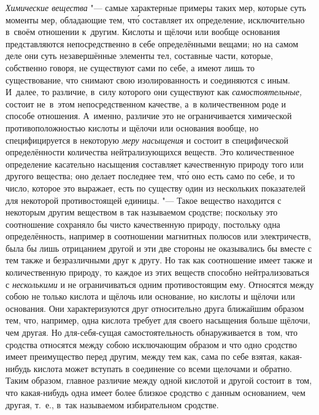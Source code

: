 {\em Химические вещества} "--- самые характерные примеры таких мер, которые
суть моменты мер, обладающие тем, чт\'{о} составляет их определение,
исключительно в~своём отношении к~другим. Кислоты и щёлочи или
вообще основания представляются непосредственно в себе определёнными вещами; но
на самом деле они суть незавершённые элементы тел, составные части, которые,
собственно говоря, не существуют сами по себе, а имеют лишь то существование,
что снимают свою изолированность и соединяются с иным. И~далее, то различие,
в~силу которого они существуют как {\em самостоятельные,} состоит не~в~этом
непосредственном качестве, а~в количественном роде и способе отношения.
А~именно, различие это не ограничивается химической противоположностью кислоты
и щёлочи или основания вообще, но специфицируется в некоторую
{\em меру насыщения} и состоит в специфической определённости количества
нейтрализующихся веществ. Это количественное определение касательно насыщения
составляет качественную природу того или другого вещества; оно делает последнее
тем, чт\'{о} оно есть само по себе, и то число, которое это выражает, есть по
существу один из нескольких показателей для некоторой противостоящей единицы.
"--- Такое вещество находится с некоторым другим веществом в так называемом
сродстве; поскольку это соотношение сохраняло бы чисто качественную природу,
постольку одна определённость, например в соотношении магнитных полюсов или
электричеств, была бы лишь отрицанием другой и эти две стороны не оказывались
бы вместе с тем также и безразличными друг к другу. Но так как соотношение
имеет также и количественную природу, то каждое из этих веществ способно
нейтрализоваться с {\em несколькими} и не ограничиваться одним противостоящим
ему. Относятся между собою не только кислота и щёлочь или основание, но кислоты
и щёлочи или основания. Они характеризуются друг относительно друга ближайшим
образом тем, что, например, одна кислота требует для своего насыщения больше
щёлочи, чем другая. Но для-себя-сущая самостоятельность обнаруживается в~том,
что сродства относятся между собою исключающим образом и что одно сродство
имеет преимущество перед другим, между тем как, сама по себе взятая,
какая-нибудь кислота может вступать в соединение со всеми щелочами и обратно.
Таким образом, главное различие между одной кислотой и другой состоит в~том,
что какая-нибудь одна имеет более близкое сродство с данным основанием, чем
другая, т.~е., в~так называемом избирательном сродстве.

